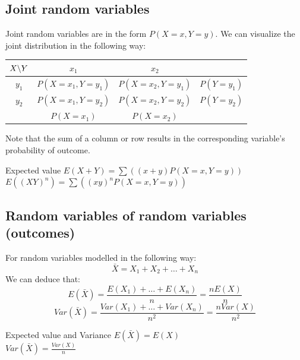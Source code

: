 \documentclass{article}
\begin{document}
\subsection{Joint random variables}
Joint random variables are in the form $P(X=x, Y=y)$. We can visualize the joint distribution in the following way:
\begin{center}
    \begin{table}[H]
        \begin{tabular}{|c|c|c|c|}
            \hline
            $X \symbol{92}Y$ & $x_1$             & $x_2$             &            \\
            \hline
            $y_1$            & $P(X=x_1, Y=y_1)$ & $P(X=x_2, Y=y_1)$ & $P(Y=y_1)$ \\
            \hline
            $y_2$            & $P(X=x_1, Y=y_2)$ & $P(X=x_2, Y=y_2)$ & $P(Y=y_2)$ \\
            \hline
                             & $P(X=x_1)$        & $P(X=x_2)$        &            \\
            \hline
        \end{tabular}
    \end{table}
    \vspace{-1cm}
\end{center}
Note that the sum of a column or row results in the corresponding variable's probability of outcome.

\begin{definition}[]{Expected value}
    $E(X+Y)   = \sum((x+y) P(X=x, Y=y))$\\
    $E((XY)^n) = \sum((xy)^n P(X=x, Y=y))$
\end{definition}

\subsection{Random variables of random variables (outcomes)}
For random variables modelled in the following way:
\[\bar{X}=X_1+X_2+\dots+X_n\]
We can deduce that:
\[E(\bar{X})=\frac{E(X_1)+\dots+E(X_n)}{n}=\frac{nE(X)}{n}\]
\[Var(\bar{X})=\frac{Var(X_1)+\dots+Var(X_n)}{n^2}=\frac{nVar(X)}{n^2}\]

\begin{definition}[]{Expected value and Variance}
    $E(\bar{X})   = E(X)$\\
    $Var(\bar{X}) = \frac{Var(X)}{n}$
\end{definition}
\end{document}
